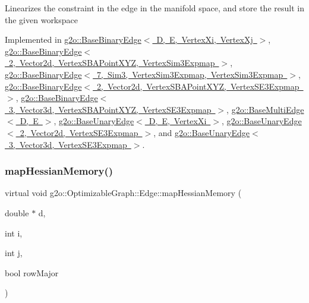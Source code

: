 Linearizes the constraint in the edge in the manifold space, and store the result in the given workspace 

Implemented in \mbox{\hyperlink{classg2o_1_1_base_binary_edge_afc3b6470e7679f027c2614484b394925}{g2o\+::\+Base\+Binary\+Edge$<$ D, E, Vertex\+Xi, Vertex\+Xj $>$}}, \mbox{\hyperlink{classg2o_1_1_base_binary_edge_afc3b6470e7679f027c2614484b394925}{g2o\+::\+Base\+Binary\+Edge$<$ 2, Vector2d, Vertex\+S\+B\+A\+Point\+X\+Y\+Z, Vertex\+Sim3\+Expmap $>$}}, \mbox{\hyperlink{classg2o_1_1_base_binary_edge_afc3b6470e7679f027c2614484b394925}{g2o\+::\+Base\+Binary\+Edge$<$ 7, Sim3, Vertex\+Sim3\+Expmap, Vertex\+Sim3\+Expmap $>$}}, \mbox{\hyperlink{classg2o_1_1_base_binary_edge_afc3b6470e7679f027c2614484b394925}{g2o\+::\+Base\+Binary\+Edge$<$ 2, Vector2d, Vertex\+S\+B\+A\+Point\+X\+Y\+Z, Vertex\+S\+E3\+Expmap $>$}}, \mbox{\hyperlink{classg2o_1_1_base_binary_edge_afc3b6470e7679f027c2614484b394925}{g2o\+::\+Base\+Binary\+Edge$<$ 3, Vector3d, Vertex\+S\+B\+A\+Point\+X\+Y\+Z, Vertex\+S\+E3\+Expmap $>$}}, \mbox{\hyperlink{classg2o_1_1_base_multi_edge_a72176776797987b8ae79ea2e33971e9e}{g2o\+::\+Base\+Multi\+Edge$<$ D, E $>$}}, \mbox{\hyperlink{classg2o_1_1_base_unary_edge_a8b396647b5b438d30a04758023baa595}{g2o\+::\+Base\+Unary\+Edge$<$ D, E, Vertex\+Xi $>$}}, \mbox{\hyperlink{classg2o_1_1_base_unary_edge_a8b396647b5b438d30a04758023baa595}{g2o\+::\+Base\+Unary\+Edge$<$ 2, Vector2d, Vertex\+S\+E3\+Expmap $>$}}, and \mbox{\hyperlink{classg2o_1_1_base_unary_edge_a8b396647b5b438d30a04758023baa595}{g2o\+::\+Base\+Unary\+Edge$<$ 3, Vector3d, Vertex\+S\+E3\+Expmap $>$}}.

\mbox{\label{classg2o_1_1_optimizable_graph_1_1_edge_a3bd233fd552daa166039acf47b69a5a7}} 
\subsubsection{\texorpdfstring{map\+Hessian\+Memory()}{mapHessianMemory()}}
{\footnotesize\ttfamily virtual void g2o\+::\+Optimizable\+Graph\+::\+Edge\+::map\+Hessian\+Memory (\begin{DoxyParamCaption}\item[{double $\ast$}]{d,  }\item[{int}]{i,  }\item[{int}]{j,  }\item[{bool}]{row\+Major }\end{DoxyParamCaption})\hspace{0.3cm}{\ttfamily [pure virtual]}}

